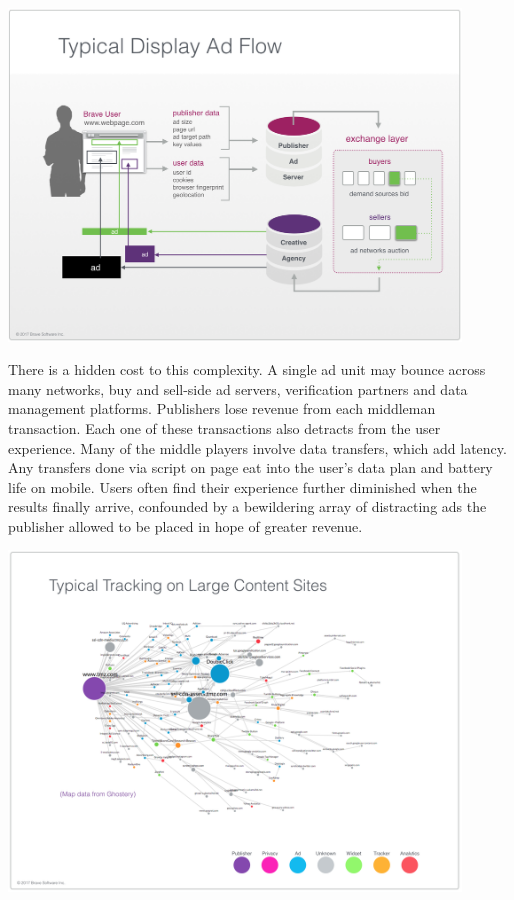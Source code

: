\documentclass[11pt]{article}
\begin{document}
\begin{center}
\includegraphics[width=0.9\textwidth]{typical_display_adflow.png}
\end{center}

There is a hidden cost to this complexity. A single ad unit may bounce across many networks, buy and sell-side ad servers, verification partners and data management platforms. Publishers lose revenue from each middleman transaction. Each one of these transactions also detracts from the user experience. Many of the middle players involve data transfers, which add latency. Any transfers done via script on page eat into the user's data plan and battery life on mobile. Users often find their experience further diminished when the results finally arrive, confounded by a bewildering array of distracting ads the publisher allowed to be placed in hope of greater revenue. 

\begin{center}
\includegraphics[width=0.9\textwidth]{tracking_map.png}
\end{center}
\end{document}
